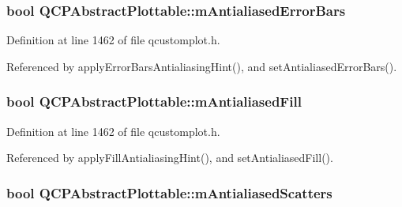 \subsubsection[{m\+Antialiased\+Error\+Bars}]{\setlength{\rightskip}{0pt plus 5cm}bool Q\+C\+P\+Abstract\+Plottable\+::m\+Antialiased\+Error\+Bars\hspace{0.3cm}{\ttfamily [protected]}}\label{class_q_c_p_abstract_plottable_ad48660b2bd301576e92fb033d8f455ea}


Definition at line 1462 of file qcustomplot.\+h.



Referenced by apply\+Error\+Bars\+Antialiasing\+Hint(), and set\+Antialiased\+Error\+Bars().

\hypertarget{class_q_c_p_abstract_plottable_a152ac765bedf927fb240545d11d453ea}{}
\subsubsection[{m\+Antialiased\+Fill}]{\setlength{\rightskip}{0pt plus 5cm}bool Q\+C\+P\+Abstract\+Plottable\+::m\+Antialiased\+Fill\hspace{0.3cm}{\ttfamily [protected]}}\label{class_q_c_p_abstract_plottable_a152ac765bedf927fb240545d11d453ea}


Definition at line 1462 of file qcustomplot.\+h.



Referenced by apply\+Fill\+Antialiasing\+Hint(), and set\+Antialiased\+Fill().

\hypertarget{class_q_c_p_abstract_plottable_aa115755e525a8e3a86dc683f9cab755b}{}
\subsubsection[{m\+Antialiased\+Scatters}]{\setlength{\rightskip}{0pt plus 5cm}bool Q\+C\+P\+Abstract\+Plottable\+::m\+Antialiased\+Scatters\hspace{0.3cm}{\ttfamily [protected]}}\label{class_q_c_p_abstract_plottable_aa115755e525a8e3a86dc683f9cab755b}


